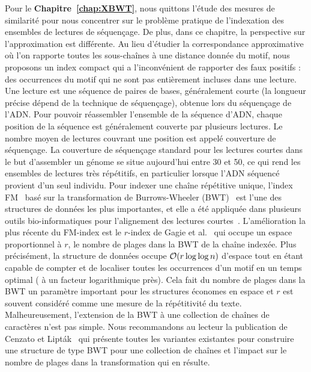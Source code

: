 Pour le \textbf{Chapitre~\ref{chap:XBWT}}, nous quittons l'étude des mesures de similarité pour nous concentrer sur le problème pratique de l'indexation des ensembles de lectures de séquençage. 
De plus, dans ce chapitre, la perspective sur l'approximation est différente. Au lieu d'étudier la correspondance approximative où l'on rapporte toutes les sous-chaînes à une distance donnée du motif, nous proposons un index compact qui a l'inconvénient de rapporter des faux positifs : des occurrences du motif qui ne sont pas entièrement incluses dans une lecture.
%
Une lecture est une séquence de paires de bases, généralement courte (la longueur précise dépend de la technique de séquençage), obtenue lors du séquençage de l'ADN. Pour pouvoir réassembler l'ensemble de la séquence d'ADN, chaque position de la séquence est généralement couverte par plusieurs lectures. Le nombre moyen de lectures couvrant une position est appelé couverture de séquençage.
La couverture de séquençage standard pour les lectures courtes dans le but d'assembler un génome se situe aujourd'hui entre 30 et 50, ce qui rend les ensembles de lectures très répétitifs, en particulier lorsque l'ADN séquencé provient d'un seul individu.
%
Pour indexer une chaîne répétitive unique, l'index FM~\cite{ferragina2005indexing} basé sur la transformation de Burrows-Wheeler (BWT)~\cite{burrows1994block} est l'une des structures de données les plus importantes, et elle a été appliquée dans plusieurs outils bio-informatiques pour l'alignement des lectures courtes~\cite{langmead2009ultrafast,langmead2012fast,li2009fast}.
%
L'amélioration la plus récente du FM-index est le $r$-index de Gagie et al.~\cite{gagie2020fully} qui occupe un espace proportionnel à $r$, le nombre de plages dans la BWT de la chaîne indexée. Plus précisément, la structure de données occupe $\mathcal{O}(r\log\log n)$ d'espace tout en étant capable de compter et de localiser toutes les occurrences d'un motif en un temps optimal ( à un facteur logarithmique près). Cela fait du nombre de plages dans la BWT un paramètre important pour les structures économes en espace et $r$ est souvent considéré comme une mesure de la répétitivité du texte.
%
Malheureusement, l'extension de la BWT à une collection de chaînes de caractères n'est pas simple. Nous recommandons au lecteur la publication de Cenzato et Lipták~\cite{cenzato_et_al_BWT_Collections} qui présente toutes les variantes existantes pour construire une structure de type BWT pour une collection de chaînes et l'impact sur le nombre de plages dans la transformation qui en résulte.

